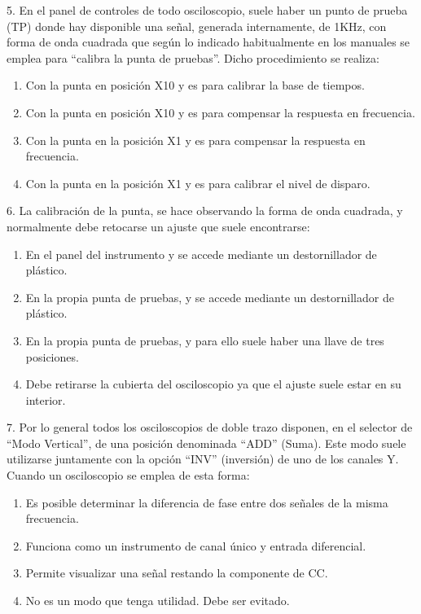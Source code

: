 5.	En el panel de controles de todo osciloscopio, suele haber un punto de prueba (TP) donde hay disponible una señal, generada internamente, de 1KHz, con forma de onda cuadrada que según lo indicado habitualmente en los manuales se emplea para “calibra la punta de pruebas”. Dicho procedimiento se realiza:
\begin{enumerate}
\item[A.] Con la punta en posición X10 y es para calibrar la base de tiempos.
\item[\fbox{B}] Con la punta en posición X10 y es para compensar la respuesta en frecuencia.
\item[C.] Con la punta en la posición X1 y es para compensar la respuesta en frecuencia.
\item[D.] Con la punta en la posición X1 y es para calibrar el nivel de disparo.
\end{enumerate}

\vspace{1em}

6.	La calibración de la punta, se hace observando la forma de onda cuadrada, y normalmente debe retocarse un ajuste que suele encontrarse:
\begin{enumerate}
\item[A.] En el panel del instrumento y se accede mediante un destornillador de plástico.
\item[\fbox{B}] En la propia punta de pruebas, y se accede mediante un destornillador de plástico.
\item[C.] En la propia punta de pruebas, y para ello suele haber una llave de tres posiciones.
\item[D.] Debe retirarse la cubierta del osciloscopio ya que el ajuste suele estar en su interior.
\end{enumerate}
\vspace{1em}
7.	Por lo general todos los osciloscopios de doble trazo disponen, en el selector de “Modo Vertical”, de una posición denominada “ADD” (Suma). Este modo suele utilizarse juntamente con la opción “INV” (inversión) de uno de los canales Y. Cuando un osciloscopio se emplea de esta forma:
\begin{enumerate}
\item[A.] Es posible determinar la diferencia de fase entre dos señales de la misma frecuencia.
\item[\fbox{B}] Funciona como un instrumento de canal único y entrada diferencial.
\item[C.] Permite visualizar una señal restando la componente de CC.
\item[D.] No es un modo que tenga utilidad. Debe ser evitado.
\end{enumerate}

